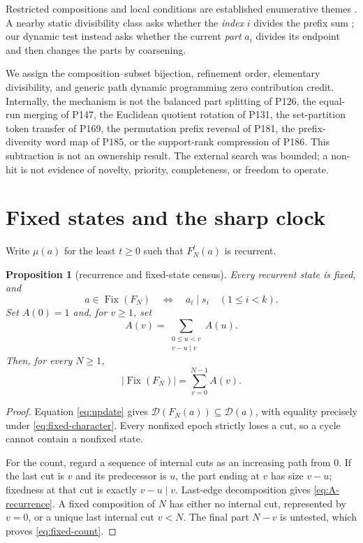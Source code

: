 \documentclass[a4paper,10pt]{amsart}
\newtheorem{proposition}[theorem]{Proposition}
\theoremstyle{remark}
\newcommand{\Cuts}{\mathcal D}
\newcommand{\Fix}{\operatorname{Fix}}
\begin{document}
Restricted compositions and local conditions are established enumerative
themes \cite{HeubachMansour2009,BenderCanfield2005}.  A nearby static
divisibility class asks whether the \emph{index} $i$ divides the prefix sum
\cite{Navarro2026OEISA398023}; our dynamic
test instead asks whether the current \emph{part} $a_i$ divides its endpoint
and then changes the parts by coarsening.

We assign the composition--subset bijection, refinement order, elementary
divisibility, and generic path dynamic programming zero contribution credit.
Internally, the mechanism is not the balanced part splitting of P126, the
equal-run merging of P147, the Euclidean quotient rotation of P131, the
set-partition token transfer of P169, the permutation prefix reversal of
P181, the prefix-diversity word map of P185, or the support-rank compression
of P186.  This subtraction is not an ownership result.  The external search
was bounded; a non-hit is not evidence of novelty, priority, completeness, or
freedom to operate.

\section{Fixed states and the sharp clock}

Write $\mu(a)$ for the least $t\geq0$ such that $F_N^t(a)$ is recurrent.

\begin{proposition}[recurrence and fixed-state census]\label{prop:fixed}
Every recurrent state is fixed, and
\begin{equation}\label{eq:fixed-character}
 a\in\Fix(F_N)\quad\Longleftrightarrow\quad
 a_i\mid s_i\quad(1\leq i<k).
\end{equation}
Set $A(0)=1$ and, for $v\geq1$, set
\begin{equation}\label{eq:A-recurrence}
 A(v)=\sum_{\substack{0\leq u<v\\v-u\mid v}}A(u).
\end{equation}
Then, for every $N\geq1$,
\begin{equation}\label{eq:fixed-count}
 |\Fix(F_N)|=\sum_{v=0}^{N-1}A(v).
\end{equation}
\end{proposition}

\begin{proof}
Equation \eqref{eq:update} gives
$\Cuts(F_N(a))\subseteq\Cuts(a)$, with equality precisely under
\eqref{eq:fixed-character}.  Every nonfixed epoch strictly loses a cut, so a
cycle cannot contain a nonfixed state.

For the count, regard a sequence of internal cuts as an increasing path from
$0$.  If the last cut is $v$ and its predecessor is $u$, the part ending at
$v$ has size $v-u$; fixedness at that cut is exactly $v-u\mid v$.
Last-edge decomposition gives \eqref{eq:A-recurrence}.  A fixed composition
of $N$ has either no internal cut, represented by $v=0$, or a unique last
internal cut $v<N$.  The final part $N-v$ is untested, which proves
\eqref{eq:fixed-count}.
\end{proof}
\end{document}
